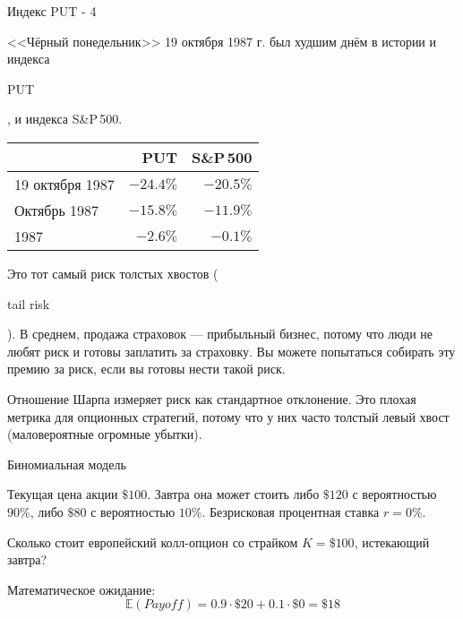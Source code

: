 \documentclass{beamer}
\newcommand{\en}[1]{\begin{otherlanguage}{english}#1\end{otherlanguage}}
\begin{document}
\begin{frame}{Индекс PUT - 4}

\justify
<<Чёрный понедельник>> 19 октября 1987 г. был худшим днём в истории и индекса \en{PUT}, и индекса S\&P\,500.

\centering
\begin{tabular}{l|r|r}
& PUT & S\&P\,500 \\ \hline
19 октября 1987 & $-24.4\%$ & $-20.5\%$ \\
Октябрь 1987 & $-15.8\%$ & $-11.9\%$ \\
1987 & $-2.6\%$ & $-0.1\%$ 
\end{tabular}

\justify
Это тот самый риск толстых хвостов (\en{tail risk}). В среднем, продажа страховок --- прибыльный бизнес, потому что люди не любят риск и готовы заплатить за страховку. Вы можете попытаться собирать эту премию за риск, если вы готовы нести такой риск.

\justify
Отношение Шарпа измеряет риск как стандартное отклонение. Это плохая метрика для опционных стратегий, потому что у них часто толстый левый хвост (маловероятные огромные убытки).
\end{frame}



\newcommand{\drawStockNode}[5]{

	\node (#5)
	[
		draw,
		rectangle,
		rounded corners,
		inner sep = 0pt,
		outer sep = 0pt,
		minimum width = 2.4cm,
		minimum height = 0.55cm,
		align = center
	]
	at (#3, #4)
	{
		\begin{tabular}{c|c}
		#1 & #2
		\end{tabular}
	};
}

\newcommand{\drawStockLink}[4]{

	\draw[
		->,
		>=triangle 90
	]
	(#1.east) -- (#2.west)
	node[
		pos = 0.5,
		anchor = #4
	]
	{#3};
}

\newcommand{\drawOneStepBinomialTree}{
	\drawStockNode{\$100}{?}{0}{0}{S0_node}
	\drawStockNode{\$120}{\$20}{4}{ 1}{Su_node}
	\drawStockNode{\$80}{\$0}{4}{-1}{Sd_node}
	
	\drawStockLink{S0_node}{Su_node}{$90\%$}{south east}	
	\drawStockLink{S0_node}{Sd_node}{$10\%$}{north east}
}

\begin{frame}{Биномиальная модель}
\centering
{}

\justify
Текущая цена акции $\$100$. Завтра она может стоить либо $\$120$ с вероятностью $90\%$, либо $\$80$ с вероятностью $10\%$. Безрисковая процентная ставка $r=0\%$.

\justify
Сколько стоит европейский колл-опцион со страйком $K=\$100$, истекающий завтра?

\justify
Математическое ожидание:
$$\mathbb{E}(Payoff) = 0.9\cdot \$20 + 0.1\cdot \$0 = \$18 $$
\end{frame}
\end{document}
